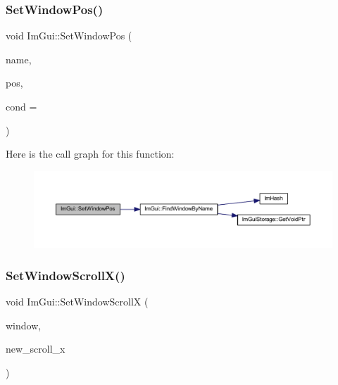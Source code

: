 \subsubsection{\texorpdfstring{Set\+Window\+Pos()}{SetWindowPos()}\hspace{0.1cm}{\footnotesize\ttfamily [2/2]}}
{\footnotesize\ttfamily void Im\+Gui\+::\+Set\+Window\+Pos (\begin{DoxyParamCaption}\item[{const char $\ast$}]{name,  }\item[{const \mbox{\hyperlink{struct_im_vec2}{Im\+Vec2}} \&}]{pos,  }\item[{\mbox{\hyperlink{imgui_8h_aef890d6ac872e12c5804d0b3e4f7f103}{Im\+Gui\+Cond}}}]{cond = {} }\end{DoxyParamCaption})}

Here is the call graph for this function\+:
\nopagebreak
\begin{figure}[H]
\begin{center}
\leavevmode
\includegraphics[width=350pt]{namespace_im_gui_a32032b56f975bb3145adbe19f38f3b56_cgraph}
\end{center}
\end{figure}
\mbox{\label{namespace_im_gui_acf275b9e13b29083f8ec22adb3e76306}} 
\subsubsection{\texorpdfstring{Set\+Window\+Scroll\+X()}{SetWindowScrollX()}}
{\footnotesize\ttfamily void Im\+Gui\+::\+Set\+Window\+ScrollX (\begin{DoxyParamCaption}\item[{\mbox{\hyperlink{struct_im_gui_window}{Im\+Gui\+Window}} $\ast$}]{window,  }\item[{float}]{new\+\_\+scroll\+\_\+x }\end{DoxyParamCaption})}

\mbox{\label{namespace_im_gui_aa6ccd0096d175543a43078b3f6ecb333}} 
